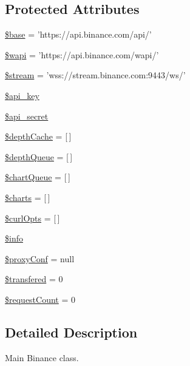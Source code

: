 \subsection*{Protected Attributes}
\begin{DoxyCompactItemize}
\item 
\hyperlink{classBinance_1_1API_ac863e52396757997d84e6783b5336828}{\$base} = 'https\-://api.\-binance.\-com/api/'
\item 
\hyperlink{classBinance_1_1API_a52a5376574ff759fb1df6c8efe24cb7f}{\$wapi} = 'https\-://api.\-binance.\-com/wapi/'
\item 
\hyperlink{classBinance_1_1API_a0ce2df2282110071b78061c3043200af}{\$stream} = 'wss\-://stream.\-binance.\-com\-:9443/ws/'
\item 
\hyperlink{classBinance_1_1API_a4b70fc1796d52440e44423da2cbafca5}{\$api\-\_\-key}
\item 
\hyperlink{classBinance_1_1API_a5612f3068ec5843031812893537e7677}{\$api\-\_\-secret}
\item 
\hyperlink{classBinance_1_1API_a69d62e886266a59b0a314cb4f5f164ca}{\$depth\-Cache} = \mbox{[}$\,$\mbox{]}
\item 
\hyperlink{classBinance_1_1API_ab04600479e07a4af0ead9ba84772bde1}{\$depth\-Queue} = \mbox{[}$\,$\mbox{]}
\item 
\hyperlink{classBinance_1_1API_aaa75d873054290eecf1dd2876237a279}{\$chart\-Queue} = \mbox{[}$\,$\mbox{]}
\item 
\hyperlink{classBinance_1_1API_a0c2d0cd199527b3b275143c49d91702e}{\$charts} = \mbox{[}$\,$\mbox{]}
\item 
\hyperlink{classBinance_1_1API_ace9645947686e99baf916e3bc189aeaf}{\$curl\-Opts} = \mbox{[}$\,$\mbox{]}
\item 
\hyperlink{classBinance_1_1API_a8d15ac7cb74ac52f8f008e61aa7cab89}{\$info}
\item 
\hyperlink{classBinance_1_1API_a1415587257942c2b5af22c642ff58005}{\$proxy\-Conf} = null
\item 
\hyperlink{classBinance_1_1API_ac40776b871ae1591348c96162e872789}{\$transfered} = 0
\item 
\hyperlink{classBinance_1_1API_a69a4bfc5a6773dff1d01166dfbb402a2}{\$request\-Count} = 0
\end{DoxyCompactItemize}


\subsection{Detailed Description}
Main Binance class. 

